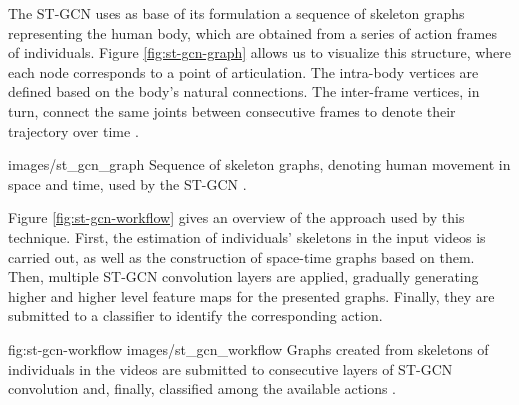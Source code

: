 The ST-GCN uses as base of its formulation a sequence of skeleton graphs representing the human body, which are obtained from a series of action frames of individuals. Figure \ref{fig:st-gcn-graph} allows us to visualize this structure, where each node corresponds to a point of articulation. The intra-body vertices are defined based on the body's natural connections. The inter-frame vertices, in turn, connect the same joints between consecutive frames to denote their trajectory over time \cite{st-gcn-2018}.


    {images/st_gcn_graph}
    {Sequence of skeleton graphs, denoting human movement in space and time, used by the ST-GCN \cite[p. 1]{st-gcn-2018}.}

Figure \ref{fig:st-gcn-workflow} gives an overview of the approach used by this technique. First, the estimation of individuals' skeletons in the input videos is carried out, as well as the construction of space-time graphs based on them. Then, multiple ST-GCN convolution layers are applied, gradually generating higher and higher level feature maps for the presented graphs. Finally, they are submitted to a classifier to identify the corresponding action.


\image
    {fig:st-gcn-workflow}
    {images/st_gcn_workflow}
    {Graphs created from skeletons of individuals in the videos are submitted to consecutive layers of ST-GCN convolution and, finally, classified among the available actions \cite[p. 3]{st-gcn-2018}.}


